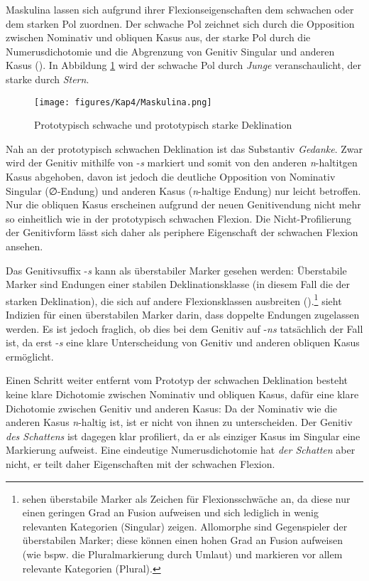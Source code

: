 Maskulina lassen sich aufgrund ihrer Flexionseigenschaften dem schwachen oder dem starken Pol zuordnen. Der schwache Pol zeichnet sich durch die Opposition zwischen Nominativ und obliquen Kasus aus, der starke Pol durch die Numerusdichotomie und die Abgrenzung von Genitiv Singular und anderen Kasus (\cite[113--114]{Thieroff.2003}). In Abbildung \ref{fig2ahj} wird der schwache Pol durch \textit{Junge} veranschaulicht, der starke durch \textit{Stern}.

\begin{figure}
\texttt{[image: figures/Kap4/Maskulina.png]}  
\caption{Prototypisch schwache und prototypisch starke Deklination}
\label{fig2ahj}
\end{figure}

Nah an der prototypisch schwachen Deklination ist das Substantiv \textit{Gedanke}. Zwar wird der Genitiv mithilfe von -\textit{s} markiert und somit von den anderen \mbox{\textit{n}-hal}\-ti\-tgen Kasus abgehoben, davon ist jedoch die deutliche Opposition von Nominativ Singular (∅-Endung) und anderen Kasus (\textit{n}-haltige Endung) nur leicht betroffen. Nur die obliquen Kasus erscheinen aufgrund der neuen Genitivendung nicht mehr so einheitlich wie in der prototypisch schwachen Flexion. Die Nicht-Profilierung der Genitivform lässt sich daher als periphere Eigenschaft der schwachen Flexion ansehen. 

 
Das Genitivsuffix -\textit{s} kann als überstabiler Marker gesehen werden: Überstabile Marker sind Endungen einer stabilen Deklinationsklasse (in diesem Fall die der starken Deklination), die sich auf andere Flexionsklassen ausbreiten (\cite[139]{Wurzel.1984}).\footnote{\textcite[100--101]{Dammel.2006} sehen überstabile Marker als Zeichen für Flexionsschwäche an, da diese nur einen geringen Grad an Fusion aufweisen und sich lediglich in wenig relevanten Kategorien (Singular) zeigen. Allomorphe sind Gegenspieler der überstabilen Marker; diese können einen hohen Grad an Fusion aufweisen (wie bspw. die Pluralmarkierung durch Umlaut) und markieren vor allem relevante Kategorien (Plural).} \textcite[140]{Wurzel.1984} sieht Indizien für einen überstabilen Marker darin, dass doppelte Endungen zugelassen werden. Es ist jedoch fraglich, ob dies bei dem Genitiv auf -\textit{ns} tatsächlich der Fall ist, da erst -\textit{s} eine klare Unterscheidung von Genitiv und anderen obliquen Kasus ermöglicht. 



Einen Schritt weiter entfernt vom Prototyp der schwachen Deklination besteht keine klare Dichotomie zwischen Nominativ und obliquen Kasus, dafür eine klare Dichotomie zwischen Genitiv und anderen Kasus: Da der Nominativ wie die anderen Kasus \textit{n}-haltig ist, ist er nicht von ihnen zu unterscheiden. Der Genitiv \textit{des Schattens} ist dagegen klar profiliert, da er als einziger Kasus im Singular eine Markierung aufweist. Eine eindeutige Numerusdichotomie hat \textit{der Schatten} aber nicht, er teilt daher Eigenschaften mit der schwachen Flexion.\largerpage


